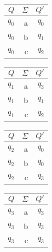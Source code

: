\begin{center}
\begin{tabular}{|r|r||r|} \hline
$Q$    & $\Sigma$           & $Q'$ \\ \hline
$q_0$    & a                  & $q_0$       \\
$q_0$    & b                  & $q_1$       \\
$q_0$    & c                  & $q_2$       \\\hline
\end{tabular}
\hspace{1em}
\begin{tabular}{|r|r||r|} \hline
$Q$    & $\Sigma$           & $Q'$ \\ \hline
$q_1$    & a                  & $q_3$       \\
$q_1$    & b                  & $q_1$       \\
$q_1$    & c                  & $q_2$       \\\hline
\end{tabular}
\hspace{1em}
\begin{tabular}{|r|r||r|} \hline
$Q$    & $\Sigma$           & $Q'$ \\ \hline
$q_2$    & a                  & $q_0$       \\
$q_2$    & b                  & $q_0$       \\
$q_2$    & c                  & $q_3$       \\\hline
\end{tabular}
\hspace{1em}
\begin{tabular}{|r|r||r|} \hline
$Q$    & $\Sigma$           & $Q'$ \\ \hline
$q_3$    & a                  & $q_3$       \\
$q_3$    & b                  & $q_3$       \\
$q_3$    & c                  & $q_3$       \\ \hline
\end{tabular}
\end{center}
